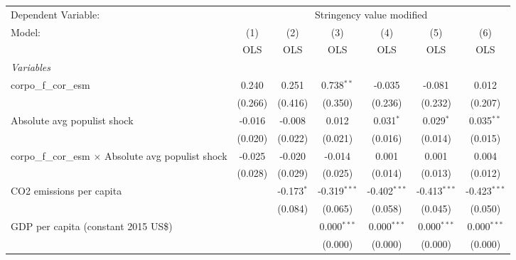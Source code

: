 
\begingroup
\centering
\begin{tabular}{lcccccc}
   \toprule
   Dependent Variable: & \multicolumn{6}{c}{Stringency value modified}\\
   Model:                                                      & (1)     & (2)          & (3)            & (4)            & (5)            & (6)\\  
                                                               &  OLS    & OLS          & OLS            & OLS            & OLS            & OLS\\  
   \midrule
   \emph{Variables}\\
   corpo\_f\_cor\_esm                                          & 0.240   & 0.251        & 0.738$^{**}$   & -0.035         & -0.081         & 0.012\\   
                                                               & (0.266) & (0.416)      & (0.350)        & (0.236)        & (0.232)        & (0.207)\\   
   Absolute avg populist shock                                 & -0.016  & -0.008       & 0.012          & 0.031$^{*}$    & 0.029$^{*}$    & 0.035$^{**}$\\   
                                                               & (0.020) & (0.022)      & (0.021)        & (0.016)        & (0.014)        & (0.015)\\   
   corpo\_f\_cor\_esm $\times$ Absolute avg populist shock     & -0.025  & -0.020       & -0.014         & 0.001          & 0.001          & 0.004\\   
                                                               & (0.028) & (0.029)      & (0.025)        & (0.014)        & (0.013)        & (0.012)\\   
   CO2 emissions per capita                                    &         & -0.173$^{*}$ & -0.319$^{***}$ & -0.402$^{***}$ & -0.413$^{***}$ & -0.423$^{***}$\\   
                                                               &         & (0.084)      & (0.065)        & (0.058)        & (0.045)        & (0.050)\\   
   GDP per capita (constant 2015 US\$)                         &         &              & 0.000$^{***}$  & 0.000$^{***}$  & 0.000$^{***}$  & 0.000$^{***}$\\   
                                                               &         &              & (0.000)        & (0.000)        & (0.000)        & (0.000)\\   

\end{tabular}
